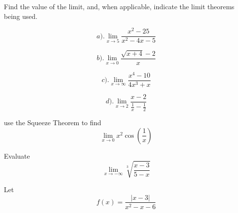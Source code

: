 \documentclass[11pt]{exam}
\begin{document}
\begin{questions}
\vfill









\addpoints
\question[24] 
Find the value of the limit, and, when applicable, indicate the limit theorems being used.  %

\begin{minipage}{.3\linewidth}
\begin{equation*}
a).   \lim_{x\to 5} \frac{x^{2}-25}{x^{2}-4x-5}
\end{equation*}
\end{minipage}%
\begin{minipage}{.7\linewidth}
\begin{equation*}
b).   \lim_{x\to 0} \frac{\sqrt{x+4}-2}{x}
\end{equation*}
\end{minipage}

\vfill\vfill

\begin{minipage}{.3\linewidth}
\begin{equation*}
c).   \lim_{x\to \infty} \frac{x^{4}-10}{4x^{3}+x}
\end{equation*}
\end{minipage}%
\begin{minipage}{.7\linewidth}
\begin{equation*}
d).   \lim_{x\to 2} \frac{x-2}{\frac{1}{x}-\frac{1}{2}}
\end{equation*}
\end{minipage}

\vfill\vfill











\newpage
\addpoints
\question[10] use the Squeeze Theorem to find 
\[ 
\lim_{x\to 0} x^{2}\cos{\left(\frac{1}{x}\right)}
\]
\vfill

\question[10] 
Evaluate 
\[ 
\lim_{x\to -\infty} \sqrt[3]{\frac{x-3}{5-x}}
\]
\vfill

\newpage
\addpoints

\addpoints
\question[15] 
Let 
\[
f(x)=\frac{|x-3|}{x^{2}-x-6}
\]


\end{questions}
\end{document}

